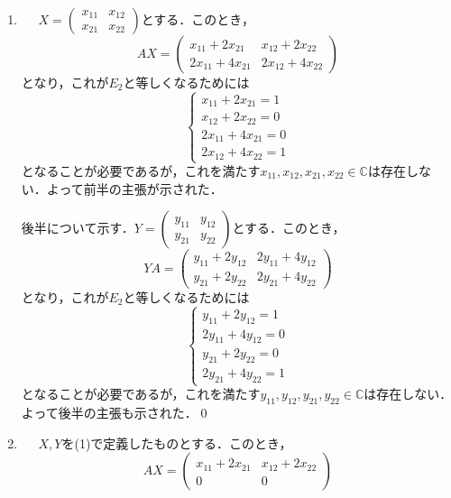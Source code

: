 \documentclass[uplatex,dvipdfmx,a4paper,10pt,fleqn]{jsarticle}
\begin{document}
\begin{tleftbar}
    \begin{enumerate}
        \item \mbox{　}
    $ X =\begin{pmatrix} x_{11} & x_{12} \\ x_{21} & x_{22} \end{pmatrix}$とする．このとき，
    \[
        AX =\begin{pmatrix} x_{11}+2x_{21} &  x_{12}+2x_{22}  \\ 2x_{11} + 4x_{21} &2x_{12} + 4x_{22} \end{pmatrix}
    \]
    となり，これが$E_2$と等しくなるためには
    \[
        \begin{cases}
            x_{11}+2x_{21} =1 \\
            x_{12}+2x_{22}  =0 \\
            2x_{11} + 4x_{21}=0 \\
            2x_{12} + 4x_{22}=1
        \end{cases}
    \]
    となることが必要であるが，これを満たす$x_{11},x_{12},x_{21},x_{22} \in \mathbb{C}$は存在しない．よって前半の主張が示された．\par 
    後半について示す．$Y =\begin{pmatrix} y_{11} & y_{12} \\ y_{21} & y_{22} \end{pmatrix}$とする．このとき，
    \[
        YA = \begin{pmatrix} y_{11} +2y_{12} & 2y_{11}+4y_{12} \\ y_{21}+2y_{22} & 2y_{21}+4y_{22}  \end{pmatrix}
    \]
    となり，これが$E_2$と等しくなるためには
    \[
        \begin{cases}
            y_{11} +2y_{12}=1 \\
            2y_{11}+4y_{12}  =0 \\
            y_{21}+2y_{22} =0 \\
            2y_{21}+4y_{22} =1
        \end{cases}
    \]
    となることが必要であるが，これを満たす$y_{11},y_{12},y_{21},y_{22} \in \mathbb{C}$は存在しない．よって後半の主張も示された．\qed
    \item \mbox{　}
        $X,Y$を(1)で定義したものとする．このとき，
        \[
            AX = \begin{pmatrix} x_{11}+2x_{21} & x_{12}+2x_{22} \\ 0 & 0 \end{pmatrix}
\]
\end{enumerate}
\end{tleftbar}
\end{document}
